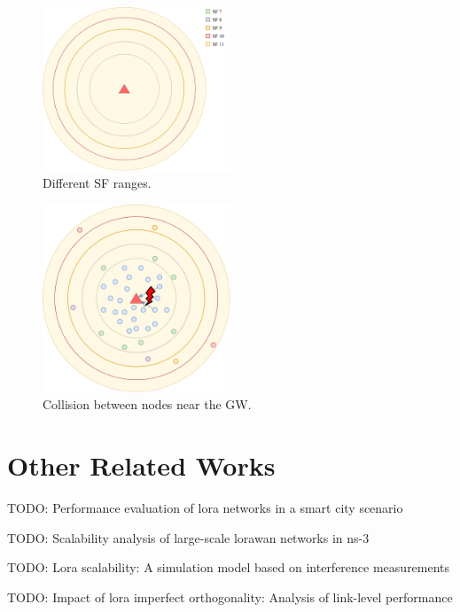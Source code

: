 \documentclass[conference]{IEEEtran}
\begin{document}
\begin{figure}
\centering
\includegraphics[width=0.5\textwidth]{lora0-1}
\caption{Different SF ranges.}
\label{fig:problem1}
\end{figure}

\begin{figure}
\centering
\includegraphics[width=0.5\textwidth]{lora1-1}
\caption{Collision between nodes near the GW.}
\label{fig:problem2}
\end{figure}


\section{Other Related Works}
\par TODO: Performance evaluation of lora networks in a smart city scenario\cite{7996384}

\par TODO: Scalability analysis of large-scale lorawan networks in ns-3 \cite{8090518}

\par TODO: Lora scalability: A simulation model based on interference measurements \cite{s17061193}

\par TODO: Impact of lora imperfect orthogonality: Analysis of link-level performance \cite{8267219}
\end{document}
